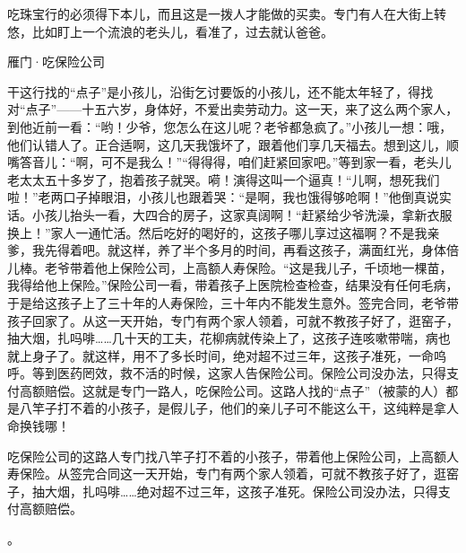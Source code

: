 \documentclass[12pt,UTF8]{ctexbook}
\begin{document}
吃珠宝行的必须得下本儿，而且这是一拨人才能做的买卖。专门有人在大街上转悠，比如盯上一个流浪的老头儿，看准了，过去就认爸爸。





雁门·吃保险公司


干这行找的“点子”是小孩儿，沿街乞讨要饭的小孩儿，还不能太年轻了，得找对“点子”——十五六岁，身体好，不爱出卖劳动力。这一天，来了这么两个家人，到他近前一看：“哟！少爷，您怎么在这儿呢？老爷都急疯了。”小孩儿一想：哦，他们认错人了。正合适啊，这几天我饿坏了，跟着他们享几天福去。想到这儿，顺嘴答音儿：“啊，可不是我么！”“得得得，咱们赶紧回家吧。”等到家一看，老头儿老太太五十多岁了，抱着孩子就哭。嗬！演得这叫一个逼真！“儿啊，想死我们啦！”老两口子掉眼泪，小孩儿也跟着哭：“是啊，我也饿得够呛啊！”他倒真说实话。小孩儿抬头一看，大四合的房子，这家真阔啊！“赶紧给少爷洗澡，拿新衣服换上！”家人一通忙活。然后吃好的喝好的，这孩子哪儿享过这福啊？不是我亲爹，我先得着吧。就这样，养了半个多月的时间，再看这孩子，满面红光，身体倍儿棒。老爷带着他上保险公司，上高额人寿保险。“这是我儿子，千顷地一棵苗，我得给他上保险。”保险公司一看，带着孩子上医院检查检查，结果没有任何毛病，于是给这孩子上了三十年的人寿保险，三十年内不能发生意外。签完合同，老爷带孩子回家了。从这一天开始，专门有两个家人领着，可就不教孩子好了，逛窑子，抽大烟，扎吗啡……几十天的工夫，花柳病就传染上了，这孩子连咳嗽带喘，病也就上身子了。就这样，用不了多长时间，绝对超不过三年，这孩子准死，一命呜呼。等到医药罔效，救不活的时候，这家人告保险公司。保险公司没办法，只得支付高额赔偿。这就是专门一路人，吃保险公司。这路人找的“点子”（被蒙的人）都是八竿子打不着的小孩子，是假儿子，他们的亲儿子可不能这么干，这纯粹是拿人命换钱哪！

吃保险公司的这路人专门找八竿子打不着的小孩子，带着他上保险公司，上高额人寿保险。从签完合同这一天开始，专门有两个家人领着，可就不教孩子好了，逛窑子，抽大烟，扎吗啡……绝对超不过三年，这孩子准死。保险公司没办法，只得支付高额赔偿。





。
\backmatter
\end{document}
